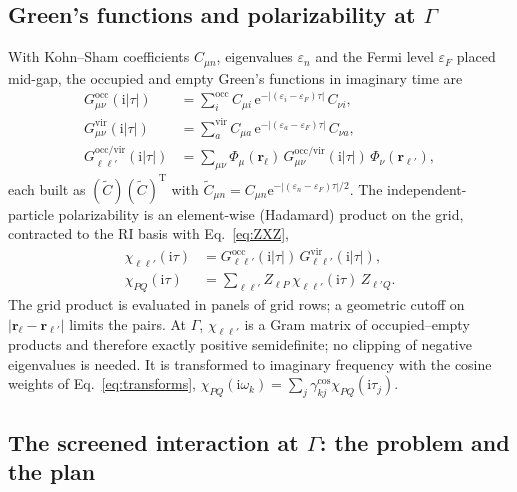 \documentclass[%
 reprint,
superscriptaddress,
 amsmath,amssymb,
 aps,
prb,
]{revtex4-2}
\newcommand{\br}{\mathbf{r}}
\newcommand{\ii}{\mathrm{i}}
\newcommand{\ee}{\mathrm{e}}
\newcommand{\Tr}{\mathrm{T}}
\newcommand{\occ}{\mathrm{occ}}
\newcommand{\vir}{\mathrm{vir}}
\begin{document}
\subsection{Green's functions and polarizability at $\Gamma$}
\label{sec:chi}

With Kohn--Sham coefficients $C_{\mu n}$, eigenvalues $\varepsilon_n$ and the Fermi level
$\varepsilon_F$ placed mid-gap, the occupied and empty Green's functions in imaginary time are
\begin{align}
  G^\occ_{\mu\nu}(\ii|\tau|) &= \sum_{i}^{\occ} C_{\mu i}\,\ee^{-|(\varepsilon_i-\varepsilon_F)\tau|}\,C_{\nu i},\nonumber\\
  G^\vir_{\mu\nu}(\ii|\tau|) &= \sum_{a}^{\vir} C_{\mu a}\,\ee^{-|(\varepsilon_a-\varepsilon_F)\tau|}\,C_{\nu a},
  \label{eq:G_ao}\\
  G^{\occ/\vir}_{\ell\ell'}(\ii|\tau|) &= \sum_{\mu\nu}\Phi_\mu(\br_\ell)\, G^{\occ/\vir}_{\mu\nu}(\ii|\tau|)\,\Phi_\nu(\br_{\ell'}),
  \label{eq:G_grid}
\end{align}
each built as $(\tilde C)(\tilde C)^\Tr$ with $\tilde C_{\mu n} = C_{\mu n}\ee^{-|(\varepsilon_n-\varepsilon_F)\tau|/2}$.
The independent-particle polarizability is an element-wise (Hadamard) product on the grid,
contracted to the RI basis with Eq.~\eqref{eq:ZXZ},
\begin{equation}
\begin{aligned}
  \chi_{\ell\ell'}(\ii\tau) &= G^\occ_{\ell\ell'}(\ii|\tau|)\,G^\vir_{\ell\ell'}(\ii|\tau|),\\
  \chi_{PQ}(\ii\tau) &= \sum_{\ell\ell'} Z_{\ell P}\,\chi_{\ell\ell'}(\ii\tau)\,Z_{\ell'Q}.
\end{aligned}
  \label{eq:chi}
\end{equation}
The grid product is evaluated in panels of grid rows; a geometric cutoff on $|\br_\ell-\br_{\ell'}|$
limits the pairs. At $\Gamma$, $\chi_{\ell\ell'}$ is a Gram matrix of occupied--empty products
and therefore exactly positive semidefinite; no clipping of negative eigenvalues is needed. It is
transformed to imaginary frequency with the cosine weights of Eq.~\eqref{eq:transforms},
$\chi_{PQ}(\ii\omega_k) = \sum_j\gamma^{\cos}_{kj}\chi_{PQ}(\ii\tau_j)$.

\subsection{The screened interaction at $\Gamma$: the problem and the plan}
\label{sec:plan}
\end{document}
